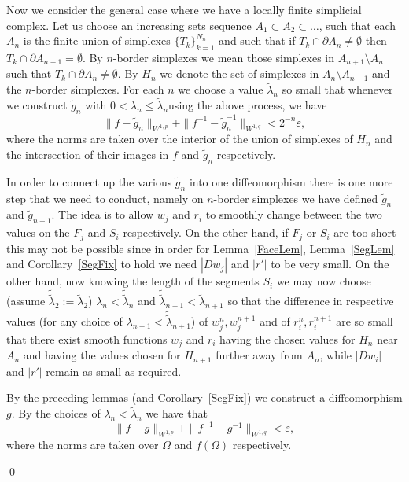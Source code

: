 \documentclass[12pt,a4paper]{amsart}
\theoremstyle{plain}
\theoremstyle{definition}
\numberwithin{equation}{section}
\def\epsilon{\varepsilon}
\begin{document}
	Now we consider the general case where we have a locally finite simplicial complex. Let us choose an increasing sets sequence $A_1\subset A_2\subset \dots$, such that each $A_n$ is the finite union of simplexes $\{T_k\}_{k=1}^{N_n}$ and such that if $T_{k}\cap \partial A_n \neq \emptyset$ then $T_k\cap \partial A_{n+1} = \emptyset$. By $n$-border simplexes we mean those simplexes in $A_{n+1}\setminus A_n$ such that $T_{k}\cap \partial A_n \neq \emptyset$. By $H_n$ we denote the set of simplexes in $A_n\setminus A_{n-1}$ and the $n$-border simplexes. For each $n$ we choose a value $\tilde{\lambda}_n$ so small that whenever we construct $\tilde{g}_n$ with $0<\lambda_n\leq \tilde{\lambda}_n$using the above process, we have
	$$
	\|f - \tilde{g}_n\|_{W^{1,p}} + \|f^{-1} - \tilde{g}^{-1}_n\|_{W^{1,q}}< 2^{-n}\epsilon,
	$$
	where the norms are taken over the interior of the union of simplexes of $H_n$ and the intersection of their images in $f$ and $\tilde{g}_n$ respectively.
	
	In order to connect up the various $\tilde{g}_n$ into one diffeomorphism there is one more step that we need to conduct, namely on $n$-border simplexes we have defined $\tilde{g}_n$ and $\tilde{g}_{n+1}$. The idea is to allow $w_j$ and $r_i$ to smoothly change between the two values on the $F_j$ and $S_i$ respectively. On the other hand, if $F_j$ or $S_i$ are too short  this may not be possible since in order for Lemma~\ref{FaceLem}, Lemma~\ref{SegLem} and Corollary~\ref{SegFix} to hold we need $|Dw_j|$ and $|r'|$ to be very small. On the other hand, now knowing the length of the segments $S_i$ we may now choose (assume $\tilde{\tilde{\lambda}}_2:= \tilde{\lambda}_2$) $\lambda_n< \tilde{\tilde{\lambda}}_n$ and $\tilde{\tilde{\lambda}}_{n+1}< \tilde{\lambda}_{n+1}$ so that the difference in respective values (for any choice of $\lambda_{n+1}<\tilde{\tilde{\lambda}}_{n+1}$) of $w_j^n, w_j^{n+1}$ and of $r_i^n, r_i^{n+1}$ are so small that there exist smooth functions $w_j$ and $r_i$ having the chosen values for $H_n$ near $A_n$ and having the values chosen for $H_{n+1}$ further away from $A_n$, while $|Dw_i|$ and $|r'|$ remain as small as required.
	
	By the preceding lemmas (and Corollary~\ref{SegFix}) we construct a diffeomorphism $g$. By the choices of $\lambda_n<\tilde{\lambda}_n$ we have that
	$$
	\|f-g\|_{W^{1,p}} +  \|f^{-1} - g^{-1}\|_{W^{1,q}}< \epsilon,
	$$ 
	where the norms are taken over $\Omega$ and $f(\Omega)$ respectively.
	
	\qed
	
\end{document}
